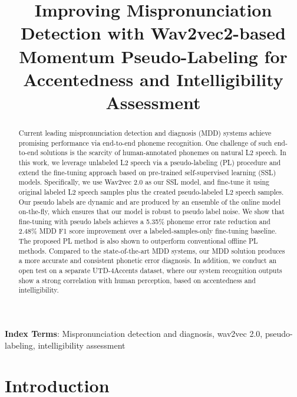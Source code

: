 \documentclass[a4paper]{article}
\title{Improving Mispronunciation Detection with Wav2vec2-based Momentum Pseudo-Labeling for Accentedness and Intelligibility Assessment}
\begin{document}
\maketitle
% 
\begin{abstract}
Current leading mispronunciation detection and diagnosis (MDD) systems achieve promising performance via end-to-end phoneme recognition. One challenge of such end-to-end solutions is the scarcity of human-annotated phonemes on natural L2 speech. In this work, we leverage unlabeled L2 speech via a pseudo-labeling (PL) procedure and extend the fine-tuning approach based on pre-trained self-supervised learning (SSL) models. Specifically, we use Wav2vec 2.0 as our SSL model, and fine-tune it using original labeled L2 speech samples plus the created pseudo-labeled L2 speech samples. Our pseudo labels are dynamic and are produced by an ensemble of the online model on-the-fly, which ensures that our model is robust to pseudo label noise. We show that fine-tuning with pseudo labels achieves a 5.35\% phoneme error rate reduction and  2.48\% MDD F1 score improvement over a labeled-samples-only fine-tuning baseline. The proposed PL method is also shown to outperform conventional offline PL methods. Compared to the state-of-the-art MDD systems, our MDD solution produces a more accurate and consistent phonetic error diagnosis. In addition, we conduct an open test on a separate UTD-4Accents dataset, where our system recognition outputs show a strong correlation with human perception, based on accentedness and intelligibility. 
\end{abstract}
\noindent\textbf{Index Terms}: Mispronunciation detection and diagnosis, wav2vec 2.0, pseudo-labeling, intelligibility assessment

\section{Introduction}
\end{document}
